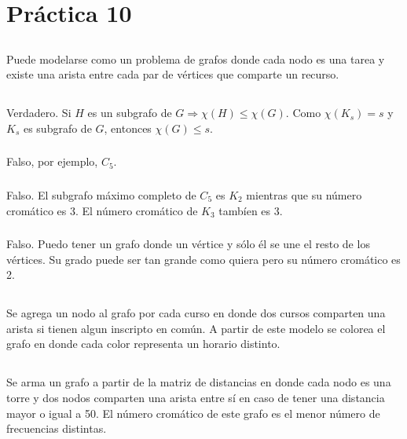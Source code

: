 \section{Práctica 10}

\setcounter{subsection}{1}
\subsection{}
Puede modelarse como un problema de grafos donde cada nodo es una tarea y existe una arista entre cada par de vértices que comparte un recurso.

\subsection{}
\subsubsection{}
Verdadero. Si $H$ es un subgrafo de $G \Longrightarrow \chi(H) \leq \chi(G)$. Como $\chi(K_s) = s$ y $K_s$ es subgrafo de $G$, entonces $\chi(G) \leq s$.

\subsubsection{}
Falso, por ejemplo, $C_5$.

\subsubsection{}
Falso. El subgrafo máximo completo de $C_5$ es $K_2$ mientras que su número cromático es 3. El número cromático de $K_3$ tambíen es 3.

\subsubsection{}
Falso. Puedo tener un grafo donde un vértice y sólo él se une el resto de los vértices. Su grado puede ser tan grande como quiera pero su número cromático es 2.

\subsection{}
Se agrega un nodo al grafo por cada curso en donde dos cursos comparten una arista si tienen algun inscripto en común. A partir de este modelo se colorea el grafo en donde cada color representa un horario distinto.

\subsection{}
Se arma un grafo a partir de la matriz de distancias en donde cada nodo es una torre y dos nodos comparten una arista entre sí en caso de tener una distancia mayor o igual a 50. El número cromático de este grafo es el menor número de frecuencias distintas.